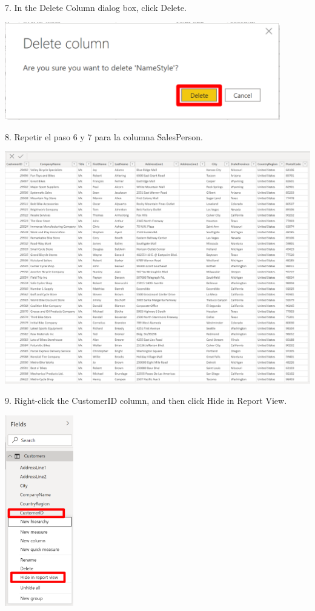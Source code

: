 \documentclass[12pt,letterpaper]{article}
\begin{document}
7. In the Delete Column dialog box, click Delete.
\begin{center}
    \includegraphics[width=12cm]{img/24.png}
    \vspace{2cm}   
\end{center}
8. Repetir el paso 6 y 7 para la columna SalesPerson.
\begin{center}
    \includegraphics[width=16cm]{img/25.png}  
\end{center}
9. Right-click the CustomerID column, and then click Hide in Report View.
\begin{center}
    \includegraphics[width=3cm]{img/26.png}  
\end{center}
\end{document}
